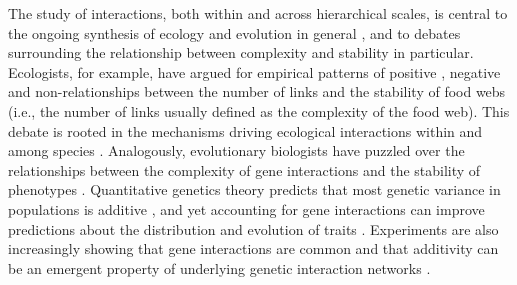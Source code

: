 \documentclass[12pt]{article}
\begin{document}
The study of interactions, both within and across hierarchical scales,
is central to the ongoing synthesis of ecology and evolution in
general \citep{Darwin:1964,Futuyma&Slatkin:1983,Thompson:2013}, and to
debates surrounding the relationship between complexity and stability
in particular. Ecologists, for example, have argued for empirical
patterns of positive \citep{MacArthur:1955}, negative \citep{May:1973}
and non-relationships \citep{Jacquetetal:2016} between the number of
links and the stability of food webs (i.e., the number of links
usually defined as the complexity of the food web). This debate is
rooted in the mechanisms driving ecological interactions within and
among species
\citep{May:1973,dunne2005modeling,Thebault&Fontaine:2010,Allesina&Tang:2012,Johnsonetal:2014,Mougi&Kondoh:2016,Graveletal:2016}. Analogously,
evolutionary biologists have puzzled over the relationships between
the complexity of gene interactions and the stability of phenotypes
\citep{Alberch:1991,Arnold:1992,Debat&David:2001,Wagner:2005}. Quantitative
genetics theory predicts that most genetic variance in populations is
additive \citep{Hilletal:2008}, and yet accounting for gene
interactions can improve predictions about the distribution and
evolution of traits \citep{Forsbergetal:2017}. Experiments are also
increasingly showing that gene interactions are common and that
additivity can be an emergent property of underlying genetic
interaction networks
\citep{Stearns:2010,EyreWalker:2010,Wagner&Zhang:2011,Mackay:2014,North&Beaumont:2015,Pavlicevetal:2015}.
\end{document}
